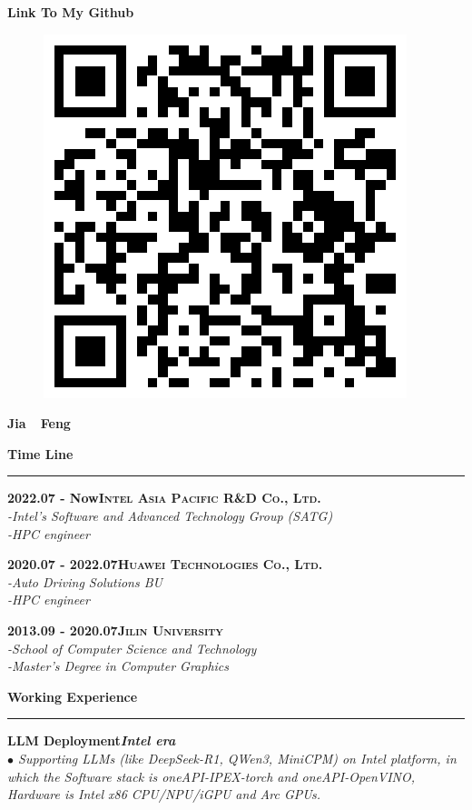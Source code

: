 \documentclass[a4paper,12pt,final]{memoir}
\newcommand{\myThemeColor}{RoyalBlue}
\newcommand{\SmallSep}{\vspace{0.9em}}
\newcommand{\CVSection}[1]
	{\Large\textbf{#1}\par
	\vspace{0.2cm}\normalsize\normalfont}
\newcommand{\CVItem}[1]
	{\textbf{\color{\myThemeColor} #1}}
\begin{document}
\begin{CJK*}{UTF8}{gbsn}
\begin{flushright}
	\SmallSep
	\SmallSep
	\SmallSep
	
	\CVItem{\large Link To My Github}
	\begin{figure}[h]
		\centering
		\includegraphics[width=0.8\columnwidth]{Github.png}
	\end{figure}
	

\end{flushright}\normalsize
\framebreak


\Huge\bfseries {\color{\myThemeColor} Jia~~Feng}\\
\normalsize\normalfont

\CVSection{Time Line}
\hrule
\SmallSep

\CVItem{2022.07 - Now\hfill\textsc{Intel Asia Pacific R\&D Co., Ltd.}}\\
\textit{-Intel's Software and Advanced Technology Group (SATG)}\\
\textit{-HPC engineer}

\CVItem{2020.07 - 2022.07\hfill\textsc{Huawei Technologies Co., Ltd.}}\\
\textit{-Auto Driving Solutions BU}\\
\textit{-HPC engineer}

\CVItem{2013.09 - 2020.07\hfill\textsc{Jilin University}}\\
\textit{-School of Computer Science and Technology}\\
\textit{-Master's Degree in Computer Graphics}

\CVSection{Working Experience}
\hrule
\SmallSep
\CVItem{LLM Deployment\hfill\emph{Intel era}}\\
\textit{$\bullet$ Supporting LLMs (like DeepSeek-R1, QWen3, MiniCPM) on Intel platform, in which the Software stack is oneAPI-IPEX-torch and oneAPI-OpenVINO, Hardware is Intel x86 CPU/NPU/iGPU and Arc GPUs. }


\end{CJK*}
\end{document}
